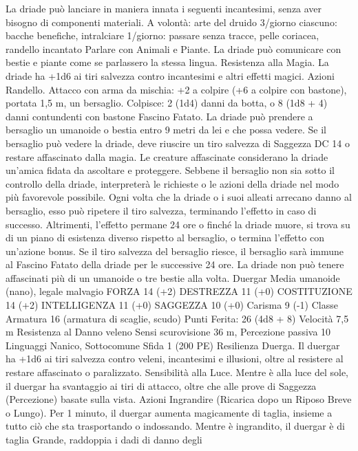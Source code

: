 \begin{multicols}{2}
La driade può lanciare in maniera innata i seguenti incantesimi,
senza aver bisogno di componenti materiali.
A volontà: arte del druido
3/giorno ciascuno: bacche benefiche, intralciare
1/giorno: passare senza tracce, pelle coriacea, randello
incantato
Parlare con Animali e Piante. La driade può comunicare con
bestie e piante come se parlassero la stessa lingua.
Resistenza alla Magia. La driade ha +1d6 ai tiri salvezza
contro incantesimi e altri effetti magici.
Azioni
Randello. Attacco con arma da mischia: +2 a colpire (+6 a
colpire con bastone), portata 1,5 m, un bersaglio.
Colpisce: 2 (1d4) danni da botta, o 8 (1d8 + 4) danni
contundenti con bastone
Fascino Fatato. La driade può prendere a bersaglio un umanoide o
bestia entro 9 metri da lei e che possa vedere. Se il bersaglio può
vedere la driade, deve riuscire un tiro salvezza di Saggezza DC 14 o
restare affascinato dalla magia. Le creature affascinate considerano la
driade un’amica fidata da ascoltare e proteggere. Sebbene il bersaglio
non sia sotto il controllo della driade, interpreterà le richieste o le
azioni della driade nel modo più favorevole possibile.
Ogni volta che la driade o i suoi alleati arrecano danno al bersaglio,
esso può ripetere il tiro salvezza, terminando l’effetto in caso di
successo. Altrimenti, l’effetto permane 24 ore o finché la driade
muore, si trova su di un piano di esistenza diverso rispetto al
bersaglio, o termina l’effetto con un’azione bonus. Se il tiro salvezza
del bersaglio riesce, il bersaglio sarà immune al Fascino Fatato della
driade per le successive 24 ore.
La driade non può tenere affascinati più di un umanoide o tre bestie
alla volta.
Duergar
Media umanoide (nano), legale malvagio
FORZA 14 (+2)
DESTREZZA 11 (+0)
COSTITUZIONE 14 (+2)
INTELLIGENZA 11 (+0)
SAGGEZZA 10 (+0)
Carisma 9 (-1)
Classe Armatura 16 (armatura di scaglie, scudo)
\hspace*{0pt}\hfill{Punti Ferita}: 26 (4d8 + 8)
Velocità 7,5 m
Resistenza al Danno veleno
Sensi scurovisione 36 m, Percezione passiva 10
Linguaggi Nanico, Sottocomune
Sfida 1 (200 PE)
Resilienza Duerga. Il duergar ha +1d6 ai tiri salvezza contro
veleni, incantesimi e illusioni, oltre al resistere al restare
affascinato o paralizzato.
Sensibilità alla Luce. Mentre è alla luce del sole, il duergar ha
svantaggio ai tiri di attacco, oltre che alle prove di Saggezza
(Percezione) basate sulla vista.
Azioni
Ingrandire (Ricarica dopo un Riposo Breve o Lungo). Per 1
minuto, il duergar aumenta magicamente di taglia, insieme a
tutto ciò che sta trasportando o indossando. Mentre è ingrandito,
il duergar è di taglia Grande, raddoppia i dadi di danno degli

\end{multicols}
